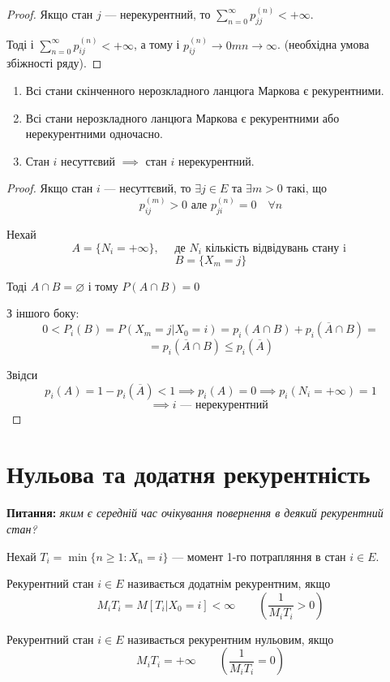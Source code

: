 \begin{proof}
  Якщо стан $j$ --- нерекурентний, то $\sum_{n=0}^{\infty} p^{(n)}_{jj} < +\infty$.

  Тоді і $\sum_{n=0}^{\infty} p^{(n)}_{ij} < +\infty$, а тому і $p^{(n)}_{ij} \to  0m n \to  \infty$.
  (необхідна умова збіжності ряду).
\end{proof}

\begin{consequence}
  \begin{enumerate}
    \item Всі стани скінченного нерозкладного ланцюга Маркова є рекурентними.
    \item Всі стани нерозкладного ланцюга Маркова є рекурентними або нерекурентними одночасно.
  \item Стан $i$ несуттєвий $\implies$ стан $i$ нерекурентний.
  \end{enumerate}
\end{consequence}

\begin{proof}
  Якщо стан $i$ --- несуттєвий, то $\exists j \in E$ та $\exists m > 0$ такі, що
  \[ p^{(m)}_{ij}>0 \text{ але } p^{(n)}_{ji} = 0 \quad \forall n \] 

  Нехай \[ A = \{ N_i = +\infty \}, \quad \text{ де $N_i$ кількість відвідувань стану i }  \] 
  \[ B = \{ X_m = j \}   \] 

  Тоді $A \cap B = \varnothing$ і тому  $P\left( A\cap B \right) = 0$

  З іншого боку:
  \[ 0 < P_i(B) = P\left( X_m = j | X_0 = i \right) =p_i\left( A\cap B \right) + p_i\left( \overline{A} \cap B \right) = \] 
  \[ = p_i(\overline{A} \cap B) \leq p_i(\overline{A}) \] 

  Звідси \[ p_i(A) = 1 - p_i(\overline{A}) < 1 \implies p_i(A) = 0 \implies
  p_i\left( N_i = +\infty \right) = 1 \] 
  \[ \implies i \text{ --- нерекурентний } \] 
\end{proof}



\section{Нульова та додатня рекурентність}

\textbf{Питання:} \textit{яким є середній час очікування повернення в деякий рекурентний стан?}

Нехай $T_i = \min \{ n\geq 1 : X_n = i \} $ --- момент 1-го потрапляння в стан $i \in E$.

\begin{definition}
  Рекурентний стан $i \in  E$ називається додатнім рекурентним, якщо
  \[ M_i T_i = M\left[ T_i | X_0 = i \right] < \infty \qquad \left( \frac{1}{M_i T_i} > 0 \right)  \] 

  Рекурентний стан $i \in  E$ називається рекурентним нульовим, якщо
  \[ M_i T_i = +\infty \qquad \left( \frac{1}{M_i T_i} = 0 \right)  \] 
\end{definition}

